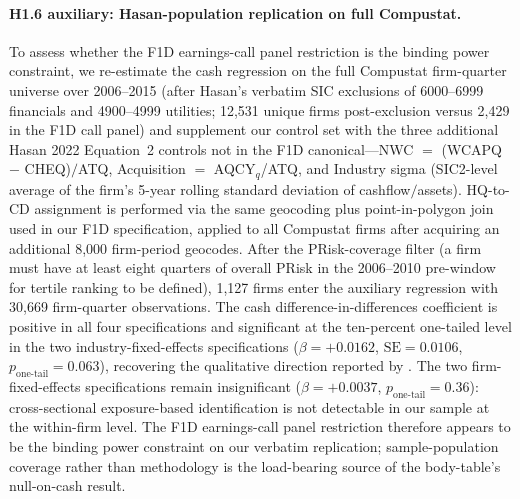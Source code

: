 \paragraph{H1.6 auxiliary: Hasan-population replication on full Compustat.}
To assess whether the F1D earnings-call panel restriction is the binding power constraint, we re-estimate the cash regression on the full Compustat firm-quarter universe over 2006--2015 (after Hasan's verbatim SIC exclusions of 6000--6999 financials and 4900--4999 utilities; 12{,}531 unique firms post-exclusion versus 2{,}429 in the F1D call panel) and supplement our control set with the three additional Hasan 2022 Equation~2 controls not in the F1D canonical---NWC $=$ (WCAPQ $-$ CHEQ)$/$ATQ, Acquisition $=$ AQCY$_q$/ATQ, and Industry sigma (SIC2-level average of the firm's 5-year rolling standard deviation of cashflow$/$assets). HQ-to-CD assignment is performed via the same geocoding plus point-in-polygon join used in our F1D specification, applied to all Compustat firms after acquiring an additional 8{,}000 firm-period geocodes. After the PRisk-coverage filter (a firm must have at least eight quarters of overall PRisk in the 2006--2010 pre-window for tertile ranking to be defined), 1{,}127 firms enter the auxiliary regression with 30{,}669 firm-quarter observations. The cash difference-in-differences coefficient is positive in all four specifications and significant at the ten-percent one-tailed level in the two industry-fixed-effects specifications ($\beta = +0.0162$, $\text{SE} = 0.0106$, $p_{\text{one-tail}} = 0.063$), recovering the qualitative direction reported by . The two firm-fixed-effects specifications remain insignificant ($\beta = +0.0037$, $p_{\text{one-tail}} = 0.36$): cross-sectional exposure-based identification is not detectable in our sample at the within-firm level. The F1D earnings-call panel restriction therefore appears to be the binding power constraint on our verbatim replication; sample-population coverage rather than methodology is the load-bearing source of the body-table's null-on-cash result.

